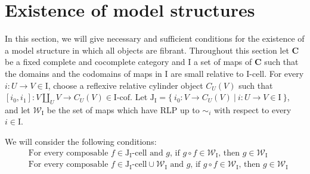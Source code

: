 \documentclass[reqno]{amsart}
\theoremstyle{definition}
\newcommand{\we}{\mathcal{W}}
\newcommand{\cat}[1]{\mathbf{#1}}
\newcommand{\C}{\cat{C}}
\newcommand{\I}{\mathrm{I}}
\newcommand{\J}{\mathrm{J}}
\newcommand{\class}[2]{#1\text{-}\mathrm{#2}}
\newcommand{\Icell}[1][\I]{\class{#1}{cell}}
\newcommand{\Icof}[1][\I]{\class{#1}{cof}}
\newcommand{\Jcell}[1][]{\Icell[\J#1]}
\newcommand{\cyli}{i}
\begin{document}
\section{Existence of model structures}

In this section, we will give necessary and sufficient conditions for the existence of a model structure in which all objects are fibrant.
Throughout this section let $\C$ be a fixed complete and cocomplete category and $\I$ a set of maps of $\C$
such that the domains and the codomains of maps in $\I$ are small relative to $\Icell$.
For every $i : U \to V \in \I$, choose a reflexive relative cylinder object $C_U(V)$
such that $[\cyli_0,\cyli_1] : V \amalg_U V \to C_U(V) \in \Icof$.
Let $\J_\I = \{\ \cyli_0 : V \to C_U(V)\ |\ i : U \to V \in \I \ \}$, and
let $\we_\I$ be the set of maps which have RLP up to $\sim_i$ with respect to every $i \in \I$.

We will consider the following conditions:
\begin{align}
& \text{For every composable $f \in \Jcell[_\I]$ and $g$, if $g \circ f \in \we_\I$, then $g \in \we_\I$} \label{cond:main} \tag{*} \\
& \text{For every composable $f \in \Jcell[_\I] \cup \we_\I$ and $g$, if $g \circ f \in \we_\I$, then $g \in \we_\I$} \label{cond:strong-main} \tag{*'}
\end{align}
\end{document}
